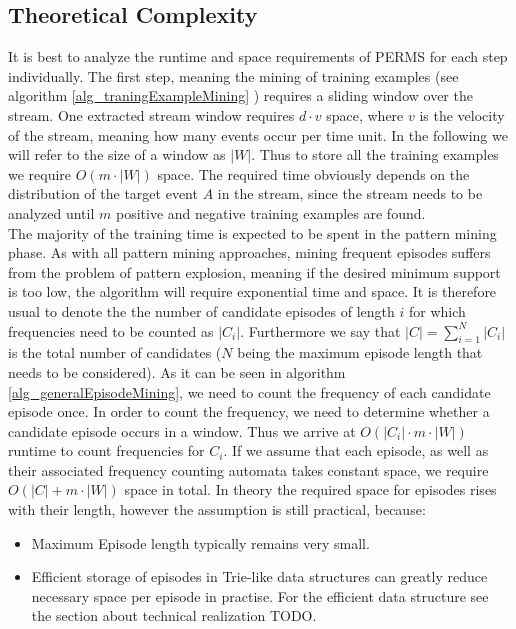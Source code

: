 \subsection{Theoretical Complexity}
It is best to analyze the runtime and space requirements of PERMS for each step individually. The first step, meaning the mining of training examples (see algorithm \ref{alg_traningExampleMining} ) requires a sliding window over the stream. One extracted stream window requires $d \cdot v$ space, where $v$ is the velocity of the stream, meaning how many events occur per time unit. In the following we will refer to the size of a window as $|W|$. Thus to store all the training examples we require $O(m \cdot |W|)$ space. The required time obviously depends on the distribution of the target event $A$ in the stream, since the stream needs to be analyzed until $m$ positive and negative training examples are found. \\
The majority of the training time is expected to be spent in the pattern mining phase. As with all pattern mining approaches, mining frequent episodes suffers from the problem of pattern explosion, meaning if the desired minimum support is too low, the algorithm will require exponential time and space. It is therefore usual to denote the the number of candidate episodes of length $i$ for which frequencies need to be counted as $|C_i|$. Furthermore we say that $|C| = \sum_{i=1}^N |C_i|$ is the total number of candidates ($N$ being the maximum episode length that needs to be considered). As it can be seen in algorithm \ref{alg_generalEpisodeMining}, we need to count the frequency of each candidate episode once. In order to count the frequency, we need to determine whether a candidate episode occurs in a window. Thus we arrive at $O(|C_i| \cdot m \cdot |W|)$ runtime to count frequencies for $C_i$. If we assume that each episode, as well as their associated frequency counting automata takes constant space, we require $O(|C| + m \cdot |W|)$ space in total. In theory the required space for episodes rises with their length, however the assumption is still practical, because:

\begin{itemize}
	\item Maximum Episode length typically remains very small.
	\item Efficient storage of episodes in Trie-like data structures can greatly reduce necessary space per episode in practise. For the efficient data structure see the section about technical realization TODO.
\end{itemize}

